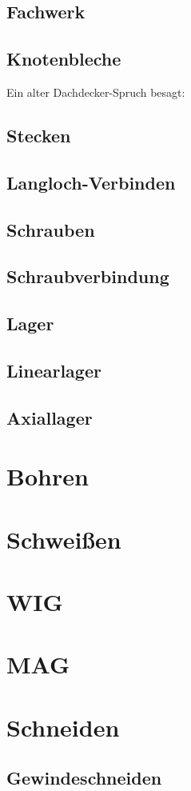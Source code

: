 \documentclass[
	a4paper,
	smallheadings,
	german,
	]
	{scrreprt}
\begin{document}
	\subsection{Fachwerk}
	\subsection{Knotenbleche}
Ein alter Dachdecker-Spruch besagt: 
	\subsection{Stecken}
	\subsection{Langloch-Verbinden}
	\subsection{Schrauben}
		\subsection{Schraubverbindung}
	\subsection{Lager}
		\subsection{Linearlager}
		\subsection{Axiallager}
\section{Bohren}
\section{Schweißen}
	\section{WIG}
	\section{MAG}
\section{Schneiden}
\subsection{Gewindeschneiden}


\printbibliography
\end{document}
